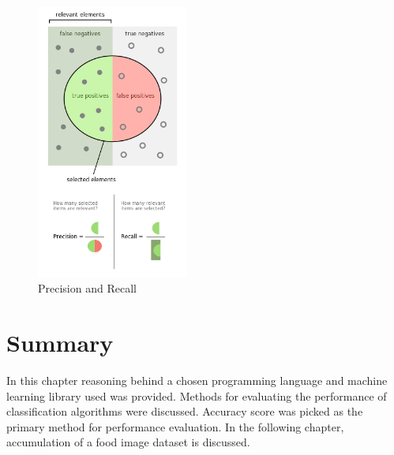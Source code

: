 \begin{figure}[ht]
\centering
\includegraphics[width=5cm]{Figures/c3/p.png}
\caption{Precision and Recall \citep{wiki:p}}
\label{fig:p}
\end{figure}


\section{Summary}
In this chapter reasoning behind a chosen programming language and machine learning library used was provided. Methods for evaluating the performance of classification algorithms were discussed. Accuracy score was picked as the primary method for performance evaluation. In the following chapter, accumulation of a food image dataset is discussed.